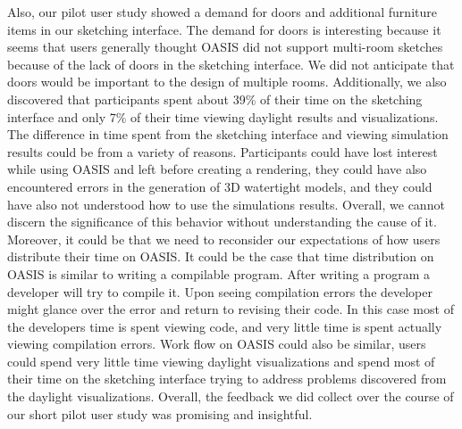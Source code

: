 Also, our pilot user study showed a demand for doors and additional furniture items in our sketching interface.  The demand for doors is interesting because it seems that users generally thought OASIS did not support multi-room sketches because of the lack of doors in the sketching interface.  We did not anticipate that doors would be important to the design of multiple rooms.  Additionally, we also discovered that participants spent about 39\% of their time on the sketching interface and only 7\% of their time viewing daylight results and visualizations.  The difference in time spent from the sketching interface and viewing simulation results could be from a variety of reasons. Participants could have lost interest while using OASIS and left before creating a rendering, they could have also encountered errors in the generation of 3D watertight models, and they could have also not understood how to use the simulations results. Overall, we cannot discern the significance of this behavior without understanding the cause of it. Moreover, it could be that we need to reconsider our expectations of how users distribute their time on OASIS.  It could be the case that time distribution on OASIS is similar to writing a compilable program. After writing a program a developer will try to compile it. Upon seeing compilation errors the developer might glance over the error and return to revising their code. In this case most of the developers time is spent viewing code, and very little time is spent actually viewing compilation errors. Work flow on OASIS could also be similar, users could spend very little time viewing daylight visualizations and spend most of their time on the sketching interface trying to address problems discovered from the daylight visualizations.  Overall, the feedback we did collect over the course of our short pilot user study was promising and insightful.  \\





